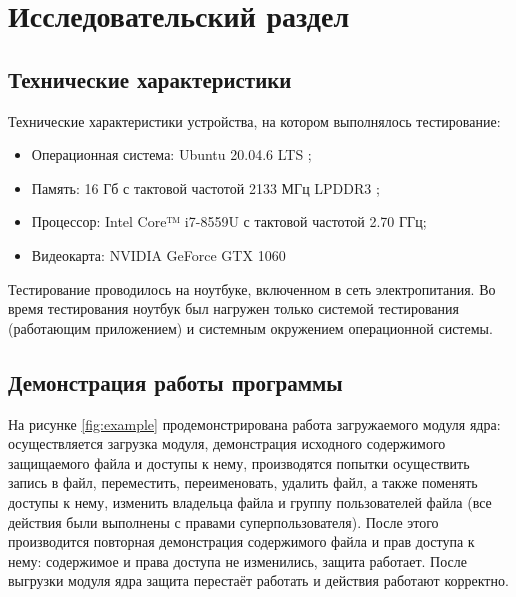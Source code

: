 \section{\large Исследовательский раздел}
\label{cha:research}

\subsection{Технические характеристики}

Технические характеристики устройства, на котором выполнялось тестирование:

\begin{itemize}[label=---]
	\item Операционная система: Ubuntu 20.04.6 LTS  \cite{ubuntu};
	\item Память: 16 Гб с тактовой частотой 2133 МГц LPDDR3 \cite{memory};
	\item Процессор: Intel Core™ i7-8559U \cite{intel} с тактовой частотой  2.70 ГГц;
	\item Видеокарта: NVIDIA GeForce GTX 1060 \cite{graphics}
\end{itemize}

Тестирование проводилось на ноутбуке, включенном в сеть электропитания. Во время тестирования ноутбук был нагружен только системой тестирования (работающим приложением) и системным окружением операционной системы.

\subsection{Демонстрация работы программы}

На рисунке \ref{fig:example} продемонстрирована работа загружаемого модуля ядра: осуществляется загрузка модуля, демонстрация исходного содержимого защищаемого файла и доступы к нему, производятся попытки осуществить запись в файл, переместить, переименовать, удалить файл, а также поменять доступы к нему, изменить владельца файла и группу пользователей файла (все действия были выполнены с правами суперпользователя). 
После этого производится повторная демонстрация содержимого файла и прав доступа к нему: содержимое и права доступа не изменились, защита работает.
После выгрузки модуля ядра защита перестаёт работать и действия работают корректно.

\clearpage

